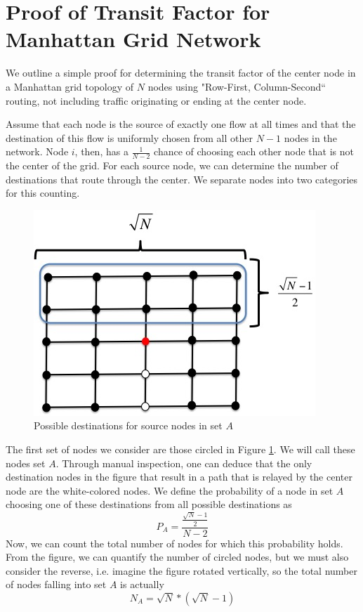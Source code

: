 \appendices

\section{Proof of Transit Factor for Manhattan Grid Network}

We outline a simple proof for determining the transit factor of the center node in a Manhattan grid topology of $N$ nodes using "Row-First, Column-Second`` routing, not including traffic originating or ending at the center node.  

Assume that each node is the source of exactly one flow at all times and that the destination of this flow is uniformly chosen from all other $N-1$ nodes in the network.  Node $i$, then, has a $\frac{1}{N-2}$ chance of choosing each other node that is not the center of the grid.  For each source node, we can determine the number of destinations that route through the center.  We separate nodes into two categories for this counting.

\begin{figure}
\begin{centering}
    \includegraphics[scale=0.50]{figures/TF_proof_fig_1.jpg}
    \caption{Possible destinations for source nodes in set $A$}
    \label{fig:TF_proof_fig_1}
\end{centering}
\end{figure}

The first set of nodes we consider are those circled in Figure \ref{fig:TF_proof_fig_1}.  We will call these nodes set $A$.  Through manual inspection, one can deduce that the only destination nodes in the figure that result in a path that is relayed by the center node are the white-colored nodes.  We define the probability of a node in set $A$ choosing one of these destinations from all possible destinations as
\begin{equation}
	P_{A} = \frac{\frac{\sqrt{N}-1}{2}}{N-2}
\end{equation}
Now, we can count the total number of nodes for which this probability holds.  From the figure, we can quantify the number of circled nodes, but we must also consider the reverse, i.e. imagine the figure rotated vertically, so the total number of nodes falling into set $A$ is actually
\begin{equation}
	N_{A} = \sqrt{N}*(\sqrt{N}-1)
\end{equation}

